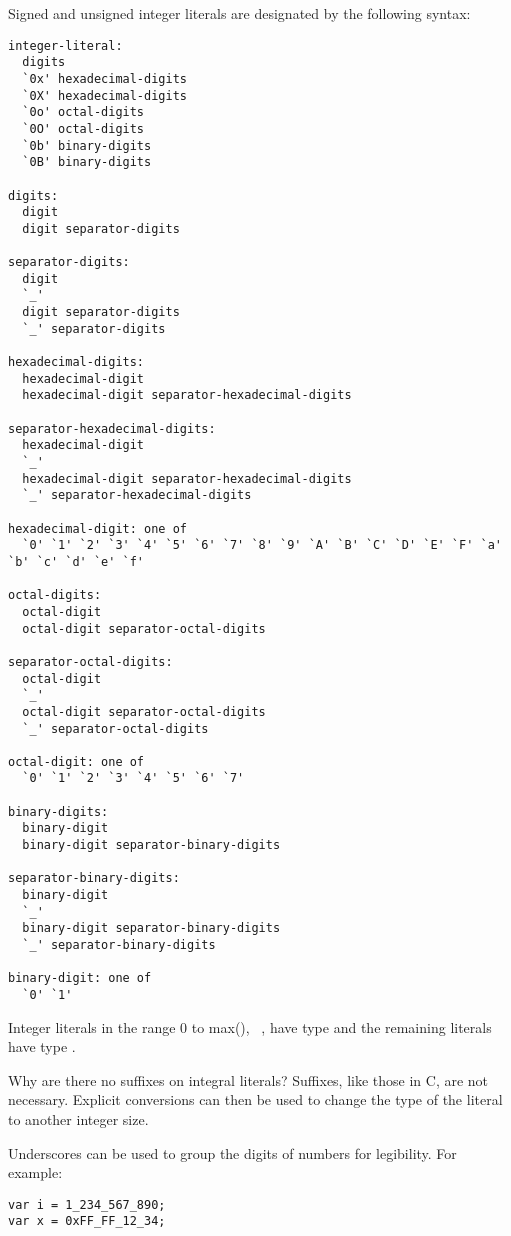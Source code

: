 Signed and unsigned integer literals are designated by the following
syntax:
\begin{syntax}
\begin{verbatim}
integer-literal:
  digits
  `0x' hexadecimal-digits
  `0X' hexadecimal-digits
  `0o' octal-digits
  `0O' octal-digits
  `0b' binary-digits
  `0B' binary-digits

digits:
  digit
  digit separator-digits

separator-digits:
  digit
  `_'
  digit separator-digits
  `_' separator-digits

hexadecimal-digits:
  hexadecimal-digit
  hexadecimal-digit separator-hexadecimal-digits

separator-hexadecimal-digits:
  hexadecimal-digit
  `_'
  hexadecimal-digit separator-hexadecimal-digits
  `_' separator-hexadecimal-digits

hexadecimal-digit: one of
  `0' `1' `2' `3' `4' `5' `6' `7' `8' `9' `A' `B' `C' `D' `E' `F' `a' `b' `c' `d' `e' `f'

octal-digits:
  octal-digit
  octal-digit separator-octal-digits

separator-octal-digits:
  octal-digit
  `_'
  octal-digit separator-octal-digits
  `_' separator-octal-digits

octal-digit: one of
  `0' `1' `2' `3' `4' `5' `6' `7'

binary-digits:
  binary-digit
  binary-digit separator-binary-digits

separator-binary-digits:
  binary-digit
  `_'
  binary-digit separator-binary-digits
  `_' separator-binary-digits

binary-digit: one of
  `0' `1'
\end{verbatim}
\end{syntax}

Integer literals in the range 0 to max(), ~,
have type  and the remaining literals have type .

\begin{rationale}
Why are there no suffixes on integral literals?  Suffixes, like those
in C, are not necessary.  Explicit
conversions can then be used to change the type of the literal to
another integer size.
\end{rationale}

\begin{rationale}
Underscores can be used to group the digits of numbers for legibility. For example:
\begin{chapel}
\begin{verbatim}
var i = 1_234_567_890;
var x = 0xFF_FF_12_34;
\end{verbatim}
\end{chapel}
\end{rationale}

